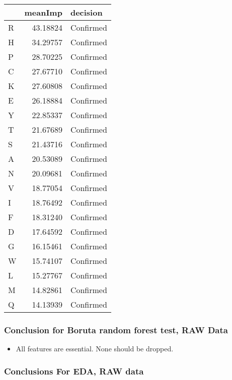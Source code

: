 \documentclass[]{article}
\providecommand{\tightlist}{%
  \setlength{\itemsep}{0pt}\setlength{\parskip}{0pt}}
\begin{document}
\begin{table}[H]
\centering
\begin{tabular}{l|r|l}
\hline
  & meanImp & decision\\
\hline
R & 43.18824 & Confirmed\\
\hline
H & 34.29757 & Confirmed\\
\hline
P & 28.70225 & Confirmed\\
\hline
C & 27.67710 & Confirmed\\
\hline
K & 27.60808 & Confirmed\\
\hline
E & 26.18884 & Confirmed\\
\hline
Y & 22.85337 & Confirmed\\
\hline
T & 21.67689 & Confirmed\\
\hline
S & 21.43716 & Confirmed\\
\hline
A & 20.53089 & Confirmed\\
\hline
N & 20.09681 & Confirmed\\
\hline
V & 18.77054 & Confirmed\\
\hline
I & 18.76492 & Confirmed\\
\hline
F & 18.31240 & Confirmed\\
\hline
D & 17.64592 & Confirmed\\
\hline
G & 16.15461 & Confirmed\\
\hline
W & 15.74107 & Confirmed\\
\hline
L & 15.27767 & Confirmed\\
\hline
M & 14.82861 & Confirmed\\
\hline
Q & 14.13939 & Confirmed\\
\hline
\end{tabular}
\end{table}

\hypertarget{conclusion-for-boruta-random-forest-test-raw-data}{%
\subsubsection{Conclusion for Boruta random forest test, RAW
Data}\label{conclusion-for-boruta-random-forest-test-raw-data}}

\begin{itemize}
\tightlist
\item
  All features are essential. None should be dropped.
\end{itemize}

\hypertarget{conclusions-for-eda-raw-data}{%
\subsubsection{Conclusions For EDA, RAW
data}\label{conclusions-for-eda-raw-data}}
\end{document}
